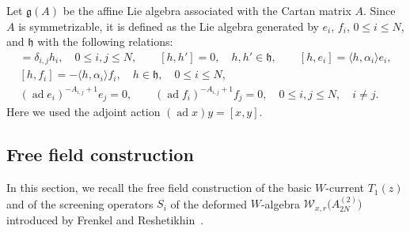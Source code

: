 \documentclass[pdftex]{sigma}
\numberwithin{equation}{section}
\begin{document}
Let ${\mathfrak g}(A)$
be the affine Lie algebra associated with the Cartan matrix $A$.
Since $A$ is symmetrizable, it is defined as the Lie algebra generated by
$e_i$, $f_i$, $0\leq i \leq N$, and ${\mathfrak h}$ with the following relations:
\begin{gather*}
[e_i, f_j]=\delta_{i,j} h_i, \quad 0\leq i,j \leq N,\qquad
[h,h']=0, \quad h,h' \in {\mathfrak h},\qquad
[h, e_i]=\langle h, \alpha_i\rangle e_i,
\\
[h, f_i]=-\langle h, \alpha_i\rangle f_i,\quad h \in {\mathfrak h}, \quad 0\leq i \leq N,
\\
(\operatorname{ad}e_i)^{-A_{i,j}+1}e_j=0,\qquad
(\operatorname{ad}f_i)^{-A_{i,j}+1}f_j=0, \quad
0\leq i, j \leq N, \quad i \neq j.
\end{gather*}
Here we used the adjoint action $(\operatorname{ad}x) y=[x,y]$.

\subsection{Free field construction}

In this section, we recall the free field construction of
the basic $W$-current $T_1(z)$
and {of} the screening operators $S_i$
of the deformed $W$-algebra ${\mathcal W}_{x,r}\big(A_{2N}^{(2)}\big)$ introduced
by Frenkel and Reshe\-ti\-khin~\cite{Frenkel-Reshetikhin1}.
\end{document}
